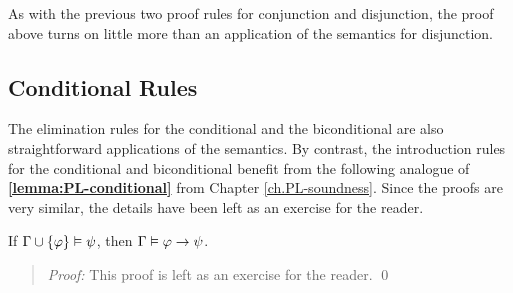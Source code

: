 As with the previous two proof rules for conjunction and disjunction, the proof above turns on little more than an application of the semantics for disjunction.




\subsection{Conditional Rules}%
  \label{sub:ConditionalRules}
  
The elimination rules for the conditional and the biconditional are also straightforward applications of the semantics.
By contrast, the introduction rules for the conditional and biconditional benefit from the following analogue of \textbf{\ref{lemma:PL-conditional}} from Chapter \ref{ch.PL-soundness}. %
Since the proofs are very similar, the details have been left as an exercise for the reader.

\begin{Lthm} \label{lemma:cond}
  If $\Gamma \cup \lbrace\varphi\rbrace \vDash \psi$, then $\Gamma \vDash \varphi \rightarrow \psi$.
\end{Lthm}

\begin{quote} 
  \textit{Proof:}
  This proof is left as an exercise for the reader.
  \qed
\end{quote}



